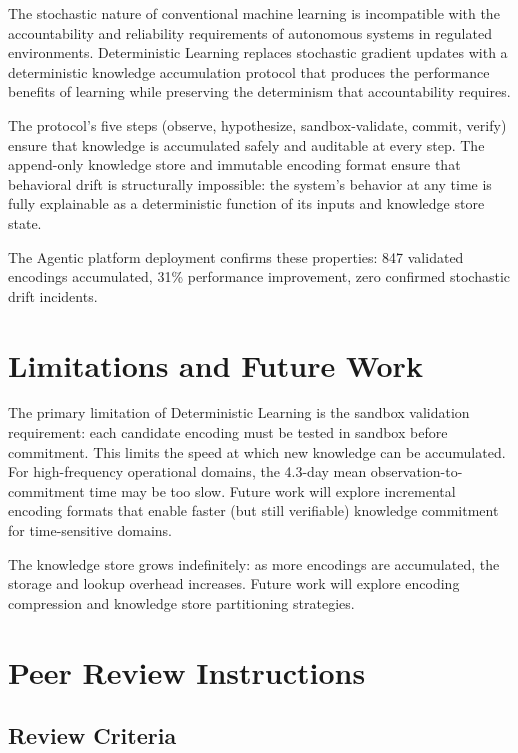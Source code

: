 \documentclass[12pt]{article}
\begin{document}
The stochastic nature of conventional machine learning is incompatible with the accountability and reliability requirements of autonomous systems in regulated environments. Deterministic Learning replaces stochastic gradient updates with a deterministic knowledge accumulation protocol that produces the performance benefits of learning while preserving the determinism that accountability requires.

The protocol's five steps (observe, hypothesize, sandbox-validate, commit, verify) ensure that knowledge is accumulated safely and auditable at every step. The append-only knowledge store and immutable encoding format ensure that behavioral drift is structurally impossible: the system's behavior at any time is fully explainable as a deterministic function of its inputs and knowledge store state.

The Agentic platform deployment confirms these properties: 847 validated encodings accumulated, 31\% performance improvement, zero confirmed stochastic drift incidents.

\section{Limitations and Future Work}
\label{sec:limitations}

The primary limitation of Deterministic Learning is the sandbox validation requirement: each candidate encoding must be tested in sandbox before commitment. This limits the speed at which new knowledge can be accumulated. For high-frequency operational domains, the 4.3-day mean observation-to-commitment time may be too slow. Future work will explore incremental encoding formats that enable faster (but still verifiable) knowledge commitment for time-sensitive domains.

The knowledge store grows indefinitely: as more encodings are accumulated, the storage and lookup overhead increases. Future work will explore encoding compression and knowledge store partitioning strategies.

\section*{Peer Review Instructions}
\label{sec:peer-review}

\subsection*{Review Criteria}
\end{document}
